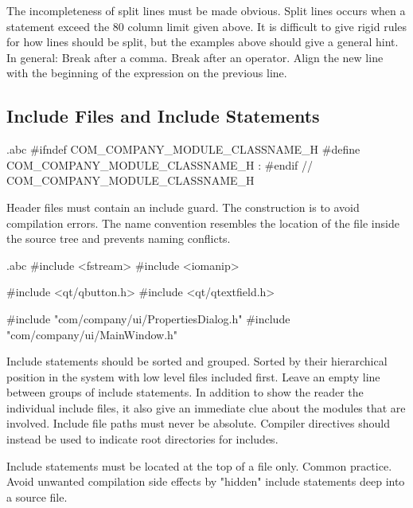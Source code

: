 \recommendation
{The incompleteness of split lines must be made obvious.}
{}
{
	Split lines occurs when a statement exceed the 80 column limit given above. It is difficult to give rigid rules for how lines should be split, but the examples above should give a general hint.\newline
	In general:\newline
	Break after a comma.\newline
	Break after an operator.\newline
	Align the new line with the beginning of the expression on the previous line.
}

\subsection{Include Files and Include Statements}

\begin{filecontents*}{\jobname.abc}
	#ifndef COM_COMPANY_MODULE_CLASSNAME_H
	#define COM_COMPANY_MODULE_CLASSNAME_H
	:
	#endif // COM_COMPANY_MODULE_CLASSNAME_H
\end{filecontents*}

\recommendation
{Header files must contain an include guard.}
{}
{The construction is to avoid compilation errors. The name convention resembles the location of the file inside the source tree and prevents naming conflicts.}


\begin{filecontents*}{\jobname.abc}
	#include <fstream>
	#include <iomanip>
	
	#include <qt/qbutton.h>
	#include <qt/qtextfield.h>
	
	#include "com/company/ui/PropertiesDialog.h"
	#include "com/company/ui/MainWindow.h"
\end{filecontents*}

\recommendation
{Include statements should be sorted and grouped. Sorted by their hierarchical position in the system with low level files included first. Leave an empty line between groups of include statements.}
{}
{
	In addition to show the reader the individual include files, it also give an immediate clue about the modules that are involved.\newline
	Include file paths must never be absolute. Compiler directives should instead be used to indicate root directories for includes.
}

\recommendation
{Include statements must be located at the top of a file only.}
{}
{Common practice. Avoid unwanted compilation side effects by "hidden" include statements deep into a source file.}


